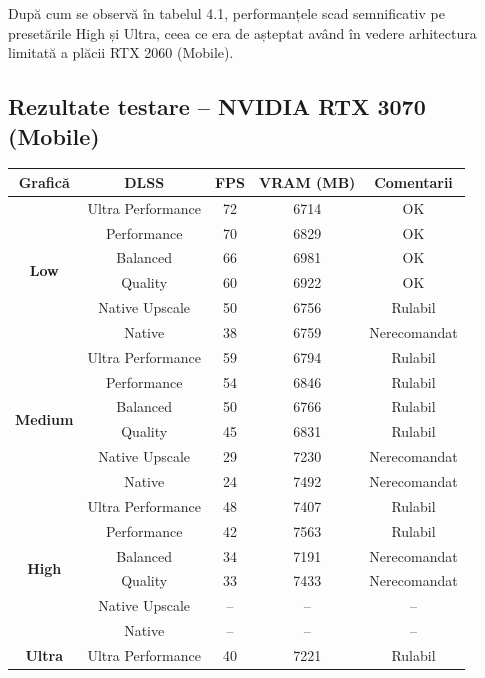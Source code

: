 După cum se observă în tabelul 4.1, performanțele scad semnificativ pe presetările High și Ultra, ceea ce era de așteptat având în vedere arhitectura limitată a plăcii RTX 2060 (Mobile).

\clearpage

\subsection*{Rezultate testare – NVIDIA RTX 3070 (Mobile)}

\begin{table}[htbp]
\centering
\renewcommand{\arraystretch}{1.2}
\begin{tabular}{|c|c|c|c|c|}
\hline
\textbf{Grafică} & \textbf{DLSS} & \textbf{FPS} & \textbf{VRAM (MB)} & \textbf{Comentarii} \\
\hline
\multirow{6}{*}{\textbf{Low}} & Ultra Performance & 72 & 6714 & OK \\
 & Performance       & 70 & 6829 & OK \\
 & Balanced          & 66 & 6981 & OK \\
 & Quality           & 60 & 6922 & OK \\
 & Native Upscale    & 50 & 6756 & Rulabil \\
 & Native            & 38 & 6759 & Nerecomandat \\
\hline
\multirow{6}{*}{\textbf{Medium}} & Ultra Performance & 59 & 6794 & Rulabil \\
 & Performance       & 54 & 6846 & Rulabil \\
 & Balanced          & 50 & 6766 & Rulabil \\
 & Quality           & 45 & 6831 & Rulabil \\
 & Native Upscale    & 29 & 7230 & Nerecomandat \\
 & Native            & 24 & 7492 & Nerecomandat \\
\hline
\multirow{6}{*}{\textbf{High}} & Ultra Performance & 48 & 7407 & Rulabil \\
 & Performance       & 42 & 7563 & Rulabil \\
 & Balanced          & 34 & 7191 & Nerecomandat \\
 & Quality           & 33 & 7433 & Nerecomandat \\
 & Native Upscale    & -- & --   & -- \\
 & Native            & -- & --   & -- \\
\hline
\multirow{6}{*}{\textbf{Ultra}} & Ultra Performance & 40 & 7221 & Rulabil \\

\end{tabular}
\end{table}
